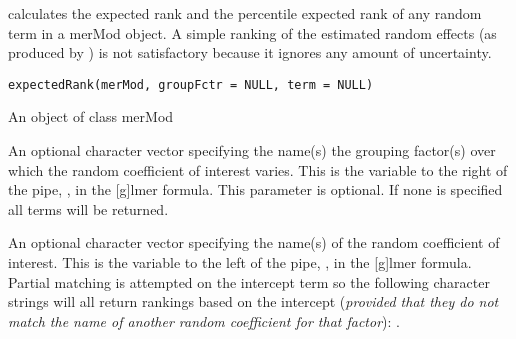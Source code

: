 \documentclass[letterpaper]{book}
\begin{document}
%
\begin{Description}\relax
{} calculates the expected rank and the percentile expected
rank of any random term in a merMod object.  A simple ranking of the estimated
random effects (as produced by ) is not satisfactory
because it ignores any amount of uncertainty.
\end{Description}
%
\begin{Usage}
\begin{verbatim}
expectedRank(merMod, groupFctr = NULL, term = NULL)
\end{verbatim}
\end{Usage}
%
\begin{Arguments}
\begin{ldescription}
\item[\code{merMod}] An object of class merMod

\item[\code{groupFctr}] An optional character vector specifying the name(s) the grouping factor(s)
over which the random coefficient of interest varies.  This is the
variable to the right of the pipe, \code{|}, in the [g]lmer formula.
This parameter is optional. If none is specified all terms will be returned.

\item[\code{term}] An optional character vector specifying the name(s) of the random coefficient of interest. This is the
variable to the left of the pipe, \code{|}, in the [g]lmer formula. Partial
matching is attempted on the intercept term so the following character
strings will all return rankings based on the intercept (\emph{provided that
they do not match the name of another random coefficient for that factor}):
.
\end{ldescription}
\end{Arguments}
%
\end{document}
